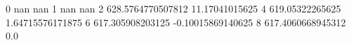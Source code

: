 0 nan nan
1 nan nan
2 628.5764770507812 11.17041015625
4 619.05322265625 1.64715576171875
6 617.305908203125 -0.10015869140625
8 617.4060668945312 0.0
